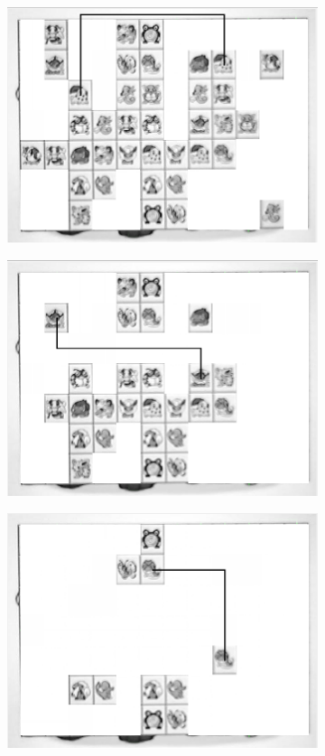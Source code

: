 \documentclass{article}
\numberwithin{figure}{section}
\numberwithin{table}{section}
\numberwithin{listing}{section}
\numberwithin{equation}{section}
\begin{document}
\begin{enumerate}
\begin{figure}[H]
\begin{subfigure}{0.5\textwidth}
                    \end{subfigure}%
                    \begin{subfigure}{0.5\textwidth}
                        \centering
                        \includegraphics[width=0.8\linewidth]{mocklink4}
                    \end{subfigure}
                    \begin{subfigure}{0.5\textwidth}
                        \centering
                        \includegraphics[width=0.8\linewidth]{mocklink5}
                    \end{subfigure}%
                    \begin{subfigure}{0.5\textwidth}
                        \centering
                        \includegraphics[width=0.8\linewidth]{mocklink6}

\end{subfigure}
\end{figure}
\end{enumerate}
\end{document}
